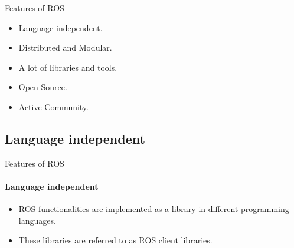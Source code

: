 \documentclass{beamer}
\begin{document}
\begin{frame}{Features of ROS}

\begin{itemize}
        \item Language independent.
        \item Distributed and Modular.
        \item A lot of libraries and tools.
        \item Open Source.
        \item Active Community.
\end{itemize}
\end{frame}

\subsection{Language independent}
\begin{frame}{Features of ROS}
\framesubtitle{Language independent}    
\begin{itemize}
    \item ROS functionalities are implemented as a library in different programming languages.
    \item  These libraries are referred to as ROS client libraries.
\end{itemize}
\end{frame}
\end{document}
